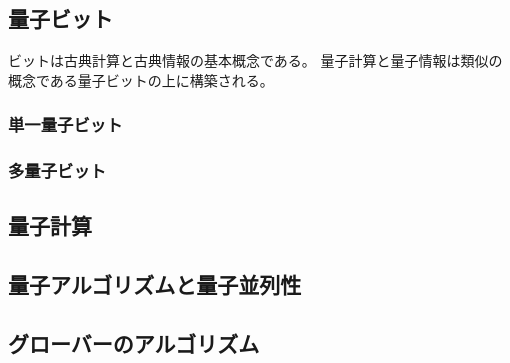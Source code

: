 \begin{comment}
    基本的内容
\end{comment}


\subsection{量子ビット}
ビットは古典計算と古典情報の基本概念である。
量子計算と量子情報は類似の概念である量子ビットの上に構築される。
\subsubsection{単一量子ビット}
% 


\subsubsection{多量子ビット}
% 


\subsection{量子計算}
% 


\subsection{量子アルゴリズムと量子並列性}


\subsection{グローバーのアルゴリズム}
